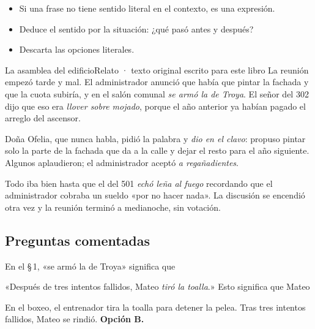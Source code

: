 \begin{regla}
\begin{itemize}
  \item Si una frase no tiene sentido literal en el contexto, es una expresión.
  \item Deduce el sentido por la situación: ¿qué pasó antes y después?
  \item Descarta las opciones literales.
\end{itemize}
\end{regla}

\begin{texto}{La asamblea del edificio}{Relato · texto original escrito para este libro}
\pa La reunión empezó tarde y mal. El administrador anunció que había que pintar la fachada y que la cuota subiría, y en el
salón comunal \emph{se armó la de Troya}. El señor del 302 dijo que eso era \emph{llover sobre mojado}, porque el año anterior
ya habían pagado el arreglo del ascensor.

\pa Doña Ofelia, que nunca habla, pidió la palabra y \emph{dio en el clavo}: propuso pintar solo la parte de la fachada que
da a la calle y dejar el resto para el año siguiente. Algunos aplaudieron; el administrador aceptó \emph{a regañadientes}.

\pa Todo iba bien hasta que el del 501 \emph{echó leña al fuego} recordando que el administrador cobraba un sueldo «por no
hacer nada». La discusión se encendió otra vez y la reunión terminó a medianoche, sin votación.
\end{texto}

\subsection{Preguntas comentadas}
\begin{comentada}{En el \S\,1, «se armó la de Troya» significa que}
\end{comentada}

\begin{reto}
«Después de tres intentos fallidos, Mateo \emph{tiró la toalla}.» Esto significa que Mateo
\end{reto}

\begin{retoresuelto}
En el boxeo, el entrenador tira la toalla para detener la pelea. Tras tres intentos fallidos, Mateo se rindió.
\textbf{Opción B.}
\end{retoresuelto}

